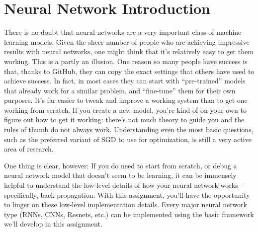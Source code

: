 \documentclass{article}
\newcommand{\sol}[1]{\textcolor{gray}{sol: #1}}
\theoremstyle{plain}
\theoremstyle{definition}
\begin{document}

\section{Neural Network Introduction}

There is no doubt that neural networks are a very important class
of machine learning models. Given the sheer number of people who are
achieving impressive results with neural networks, one might think
that it's relatively easy to get them working. This is a partly an
illusion. One reason so many people have success is that, thanks to
GitHub, they can copy the exact settings that others have used to
achieve success. In fact, in most cases they can start with ``pre-trained''
models that already work for a similar problem, and ``fine-tune''
them for their own purposes. It's far easier to tweak and improve
a working system than to get one working from scratch. If you create
a new model, you're kind of on your own to figure out how to get it
working: there's not much theory to guide you and the rules of thumb
do not always work. Understanding even the most basic questions, such
as the preferred variant of SGD to use for optimization, is still
a very active area of research.

One thing is clear, however: If you do need to start from scratch,
or debug a neural network model that doesn't seem to be learning,
it can be immensely helpful to understand the low-level details of
how your neural network works -- specifically, back-propagation.
With this assignment, you'll have the opportunity to linger on these
low-level implementation details. Every major neural network type
(RNNs, CNNs, Resnets, etc.) can be implemented using the basic framework
we'll develop in this assignment.
\end{document}
